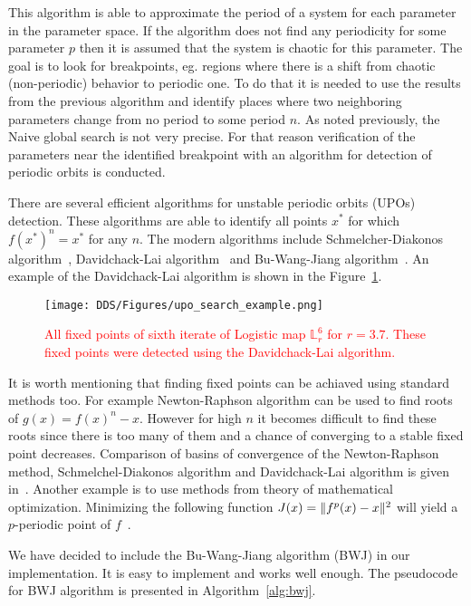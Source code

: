 This algorithm is able to approximate the period of a system for each parameter in the parameter space.
If the algorithm does not find any periodicity for some parameter $p$ then it is assumed that the system is chaotic for this parameter.
The goal is to look for breakpoints, eg. regions where there is a shift from chaotic (non-periodic) behavior to periodic one.
To do that it is needed to use the results from the previous algorithm and identify places where two neighboring parameters change from no period to some period $n$.
As noted previously, the Naive global search is not very precise. For that reason verification of the parameters near the identified breakpoint with an algorithm for detection of periodic orbits is conducted.
\par
There are several efficient algorithms for unstable periodic orbits (UPOs) detection.
These algorithms are able to identify all points $x^{*}$ for which $f(x^{*})^{n}=x^{*}$ for any $n$.
The modern algorithms include Schmelcher-Diakonos algorithm~\cite{Schmelcher1997}, Davidchack-Lai algorithm~\cite{Davidchack1999,Davidchack2001,Klebanoff2001} and Bu-Wang-Jiang algorithm~\cite{Bu2004}.
An example of the Davidchack-Lai algorithm is shown in the Figure~\ref{fig:upo_search_example}.

\begin{figure}[!h]
    \centering
    \texttt{[image: DDS/Figures/upo\_search\_example.png]}
    \caption{
        \textcolor{red}{
        All fixed points of sixth iterate of Logistic map $\mathbb{L}_{r}^{6}$ for $r = 3.7$.
        These fixed points were detected using the Davidchack-Lai algorithm.
        }
    }
    \label{fig:upo_search_example}
\end{figure}

\par
It is worth mentioning that finding fixed points can be achiaved using standard methods too.
For example Newton-Raphson algorithm can be used to find roots of $g(x) = f(x)^{n} - x$.
However for high $n$ it becomes difficult to find these roots since there is too many of them and a chance of converging to a stable fixed point decreases.
Comparison of basins of convergence of the Newton-Raphson method, Schmelchel-Diakonos algorithm and Davidchack-Lai algorithm is given in~\cite{Davidchack1999}.
Another example is to use methods from theory of mathematical optimization.
Minimizing the following function $J(x)= \lVert f^{p}(x)-x\rVert^{2}$ will yield a $p$-periodic point of $f$~\cite{Fuh2009}.
\par
We have decided to include the Bu-Wang-Jiang algorithm (BWJ) in our implementation.
It is easy to implement and works well enough.
The pseudocode for BWJ algorithm is presented in Algorithm~\ref{alg:bwj}.

